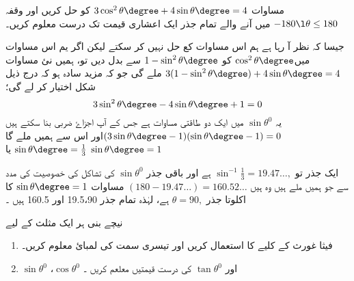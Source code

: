مساوات \(3\cos^2\theta\degree+4\sin\theta\degree=4\) کو حل کریں اور وقفہ 
\(-180\l \theta \le 180\)
میں آنے والے تمام جذر ایک اعشاری قیمت تک درست معلوم کریں۔

جیسا کہ نظر آ رہا ہے ہم اس مساوات کع حل نہیں کر سکتے لیکن اگر یم اس مساوات میں\(\cos^2\theta\degree\)  کو  \(1-\sin^2\theta\degree\) سے بدل دیں تو، ہمیں نئ مساوات \(3(1-\sin^2\theta\degree)+4\sin\theta\degree=4\) ملے گی جو کہ مزید سادہ ہو کہ درج ذیل شکل اختیار کر لے گی؛
\[3\sin^2\theta\degree-4\sin\theta\degree+1=0\]
یہ \( \sin \theta^{0}\)  میں ایک دو طاقتی مساوات ہے جس کے  آپ اجزاۓ ضربی بنا سکتے ہیں\((3\sin\theta\degree-1)(\sin\theta\degree-1)=0\)اور اس سے ہمیں ملے گا\(\sin\theta\degree=\frac{1}{3}\) یا \(\sin\theta\degree=1\)

ایک جذر تو \(\sin^{-1}\frac{1}{3}=19.47\ldots,\) ہے اور باقی جذر \( \sin \theta^{0}\)   کی تشاکل کی خصوصیت کی مدد سے جو ہمیں ملے ہیں وہ ہیں 
\( (180-19.47\ldots)=160.52\ldots\)
مساوات \(\sin\theta\degree=1\) کا اکلوتا جذر \(\theta=90,\) ہے، لہٰذہ تمام جذر 19.5،90 اور 160.5 ہیں ۔


نیچے بنی ہر ایک مثلث کے لیے 
\begin{enumerate}
\item  
فیثا غورث کے کلیے کا استعمال کریں اور تیسری سمت کی لمبائ معلوم کریں۔
\item
\( \sin \theta^{0}\)   ،\( \cos \theta^{0}\)   
اور \( \tan \theta^{0}\) کی درست قیمتیں معلعم کریں ۔
\end{enumerate}

